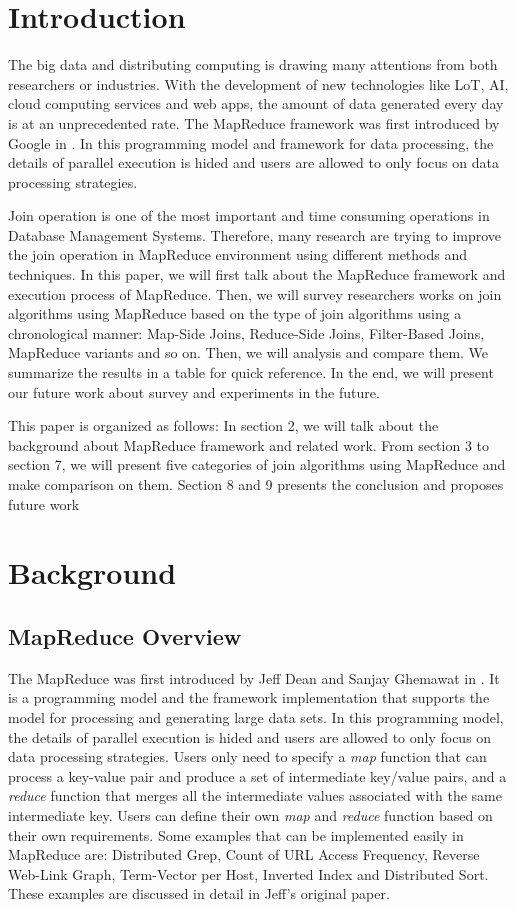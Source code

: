 \documentclass[sigconf, nonacm]{acmart}
\begin{document}
\section{Introduction}

The big data and distributing computing is drawing many attentions from both researchers or industries. With the development of new technologies like LoT, AI, cloud computing services and web apps, the amount of data generated every day is at an unprecedented rate.  The MapReduce framework was first introduced by Google in \cite{62}. In this programming model and framework for data processing, the details of parallel execution is hided and users are allowed to only focus on data processing strategies. 

Join operation is one of the most important and time consuming operations in Database Management Systems. Therefore, many research are trying to improve the join operation in MapReduce environment using different methods and techniques. In this paper, we will first talk about the MapReduce framework and execution process of MapReduce. Then, we will survey researchers works on join algorithms using MapReduce based on the type of join algorithms using a chronological manner: Map-Side Joins, Reduce-Side Joins, Filter-Based Joins, MapReduce variants and so on. Then, we will analysis and compare them. We summarize the results in a table for quick reference. In the end, we will present our future work about survey and experiments in the future. 

This paper is organized as follows: In section 2, we will talk about the background about MapReduce framework and related work. From section 3 to section 7, we will present five categories of join algorithms using MapReduce and make comparison on them. Section 8 and 9 presents the conclusion and proposes future work
\section{Background}

\subsection{MapReduce Overview}
The MapReduce was first introduced by Jeff Dean and Sanjay Ghemawat in \cite{62}. It is a programming model and the framework implementation that supports the model for processing and generating large data sets. In this programming model, the details of parallel execution is hided and users are allowed to only focus on data processing strategies. Users only need to specify a \textit{map} function that can process a key-value pair and produce a set of intermediate key/value pairs, and a \textit{reduce} function that merges all the intermediate values associated with the same intermediate key. Users can define their own \textit{map} and \textit{reduce} function based on their own requirements. Some examples that can be implemented easily in MapReduce are: Distributed Grep, Count of URL Access Frequency, Reverse Web-Link Graph, Term-Vector per Host, Inverted Index and Distributed Sort. These examples are discussed in detail in Jeff's original paper.
\end{document}
